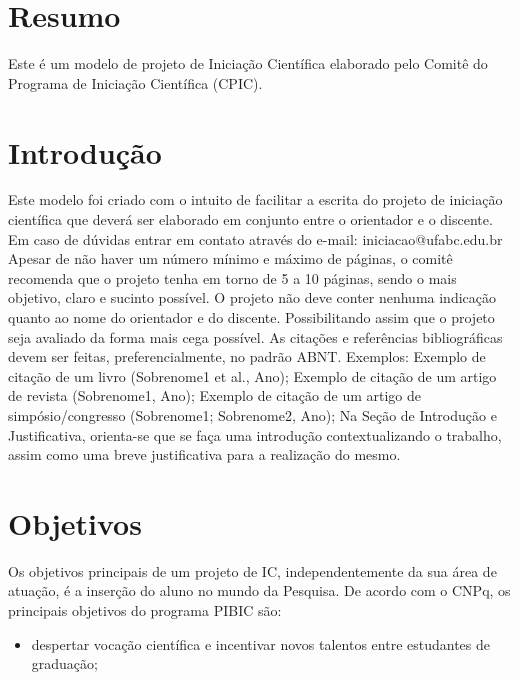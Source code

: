 \documentclass[a4paper,12pt]{article}
\begin{document}
\newpage


\tableofcontents

\newpage

\onehalfspacing
{
\section{Resumo}
Este é um modelo de projeto de Iniciação Científica elaborado pelo Comitê do Programa de Iniciação Científica (CPIC).

\section{Introdução}
 Este modelo foi criado com o intuito de facilitar a escrita do projeto de iniciação científica que deverá ser elaborado em conjunto entre o orientador e o discente. Em caso de dúvidas entrar em contato através do e-mail: iniciacao@ufabc.edu.br
Apesar de não haver um número mínimo e máximo de páginas, o comitê recomenda que o projeto tenha em torno de 5 a 10 páginas, sendo o mais objetivo, claro e sucinto possível.
O projeto não deve conter nenhuma indicação quanto ao nome do orientador e do discente. Possibilitando assim que o projeto seja avaliado da forma mais cega possível.
As citações e referências bibliográficas devem ser feitas, preferencialmente, no padrão ABNT. Exemplos:
Exemplo de citação de um livro (Sobrenome1 et al., Ano);
Exemplo de citação de um artigo de revista (Sobrenome1, Ano);
Exemplo de citação de um artigo de simpósio/congresso (Sobrenome1; Sobrenome2, Ano);
Na Seção de Introdução e Justificativa, orienta-se que se faça uma introdução contextualizando o trabalho, assim como uma breve justificativa para a realização do mesmo. \cite{Fluri_2019}


\section{Objetivos}
Os objetivos principais de um projeto de IC, independentemente da sua área de atuação, é a inserção do aluno no mundo da Pesquisa. De acordo com o CNPq, os principais objetivos do programa PIBIC são:


\begin{itemize}
    \item despertar vocação científica e incentivar novos talentos entre estudantes de graduação;


\end{itemize}}
\end{document}
